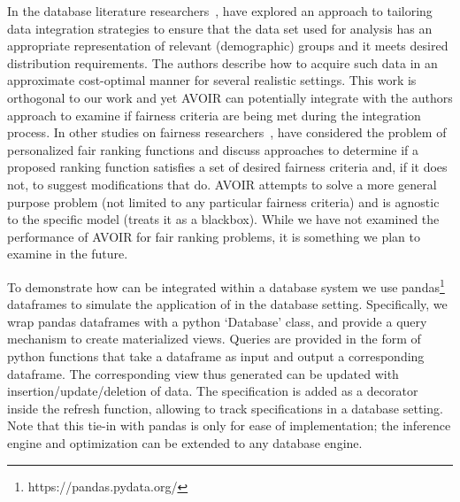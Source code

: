 \begin{subappendices}
In the database literature researchers~\cite{nargesian21tailoring}, have explored an approach to tailoring data integration strategies to ensure that the data set used for analysis has an appropriate representation of relevant (demographic) groups and it meets desired distribution requirements. The authors describe how to acquire such data in an approximate cost-optimal manner for several realistic settings. This work is orthogonal to our work and yet AVOIR can potentially integrate with the authors approach to examine if fairness criteria are being met during the integration process. In other studies on fairness researchers~\cite{yang2018nutritional,asudeh19a,asudeh19b}, have considered the problem of personalized fair ranking functions and discuss approaches to determine if a proposed ranking function satisfies a set of  desired fairness criteria and, if it does not, to suggest modifications that do. AVOIR attempts to solve a  more general purpose problem (not limited to any particular fairness criteria) and is agnostic to the specific model (treats it as a blackbox).  While we have not examined the performance of AVOIR for fair ranking problems, it is something we plan to examine in the future.

To demonstrate how \AVOIRmethodname{} can be integrated within a database system
we use pandas\footnote{https://pandas.pydata.org/} dataframes to simulate the application of \AVOIRmethodname{} in the database setting. 
Specifically, we wrap pandas dataframes with a python `Database' class, and provide a query mechanism to create materialized views.
Queries are provided in the form of python functions that take a dataframe as input and output a corresponding dataframe.
The corresponding view thus generated can be updated with insertion/update/deletion of data.
The specification is added as a decorator inside the refresh function, allowing \AVOIRmethodname{} to track specifications in a database setting.
Note that this tie-in with pandas is only for ease of implementation; the inference engine and optimization can be extended to any database engine.


\end{subappendices}